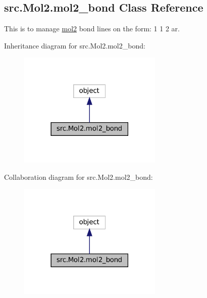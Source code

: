\hypertarget{classsrc_1_1Mol2_1_1mol2__bond}{}\subsection{src.\+Mol2.\+mol2\+\_\+bond Class Reference}
\label{classsrc_1_1Mol2_1_1mol2__bond}


This is to manage \hyperlink{classsrc_1_1Mol2_1_1mol2}{mol2} bond lines on the form\+: 1 1 2 ar.  




Inheritance diagram for src.\+Mol2.\+mol2\+\_\+bond\+:
\nopagebreak
\begin{figure}[H]
\begin{center}
\leavevmode
\includegraphics[width=194pt]{classsrc_1_1Mol2_1_1mol2__bond__inherit__graph}
\end{center}
\end{figure}


Collaboration diagram for src.\+Mol2.\+mol2\+\_\+bond\+:
\nopagebreak
\begin{figure}[H]
\begin{center}
\leavevmode
\includegraphics[width=194pt]{classsrc_1_1Mol2_1_1mol2__bond__coll__graph}
\end{center}
\end{figure}
